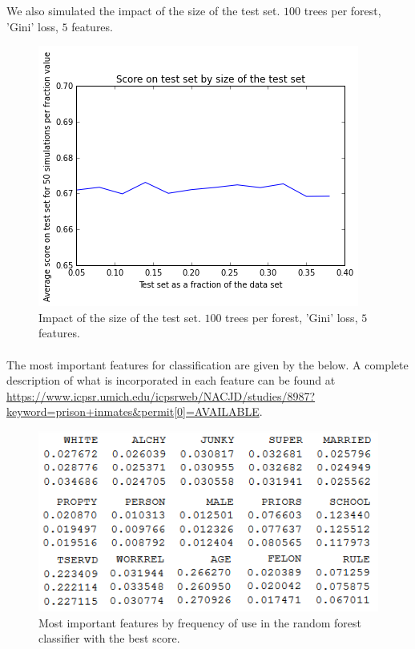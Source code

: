 \documentclass[a4paper]{article}
\theoremstyle{plain}
\begin{document}
We also simulated the impact of the size of the test set. $100$ trees per forest, 'Gini' loss, $5$ features.

\begin{figure}[H]
\centering
\includegraphics[scale=0.8]{test_size.png}
\caption{Impact of the size of the test set. $100$ trees per forest, 'Gini' loss, $5$ features.}
\end{figure}


\paragraph{}
The most important features for classification are given by the below. A complete description of what is incorporated in each feature can be found at \url{https://www.icpsr.umich.edu/icpsrweb/NACJD/studies/8987?keyword=prison+inmates&permit[0]=AVAILABLE}.


\begin{figure}[H]
\centering
\includegraphics[scale=0.8]{features_weights.png}
\caption{Most important features by frequency of use in the random forest classifier with the best score.}
\end{figure}
\end{document}
